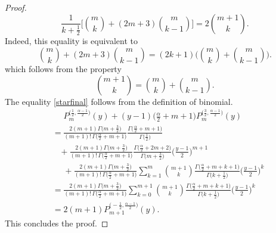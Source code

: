 \documentclass[10pt,a4paper]{amsart}
\begin{document}
\begin{proof}
\begin{equation}
\label{starfinal}
\frac{1}{k+\frac{1}{2}}\bigg[\binom{m}{k}+(2m+3) \binom{m}{k-1}\bigg] = 2\binom{m+1}{k}.
\end{equation}
Indeed, this equality is equivalent to
\[
\binom{m}{k}+(2m+3) \binom{m}{k-1} = (2k+1)\bigg( \binom{m}{k}+\binom{m}{k-1}\bigg).
\]
which follows from the property
$$\binom{m+1}{k}=\binom{m}{k}+\binom{m}{k-1}.
$$
The equality \eqref{starfinal} follows from the definition of binomial.
\begin{align*}
	&\phantom{=}P_m^{\big(\frac{1}{2},\frac{\alpha-1}{2}\big)}(y)+(y-1)\Big(\frac{\alpha}{2}+m+1\Big)P_m^{\big(\frac{3}{2}, \frac{\alpha-1}{2}\big)}(y)\\
	&=\frac{2(m+1)\Gamma \big(m+\frac{3}{2}\big)}{(m+1)!\, \Gamma \big(\frac{\alpha}{2}+m+1\big)} \frac{\Gamma \big(\frac{\alpha}{2}+m+1\big)}{\Gamma\big(\frac{1}{2}\big)}\\
	& \, \, \, \, \,  +\frac{2(m+1)\Gamma \big(m+\frac{3}{2}\big)}{(m+1)!\, \Gamma \big(\frac{\alpha}{2}+m+1\big)} \frac{\Gamma \big(\frac{\alpha}{2}+2m+2\big)}{\Gamma\big(m+\frac{3}{2}\big)}\bigg(\frac{y-1}{2}\bigg)^{m+1}\\
	&\phantom{=}+
	\frac{2(m+1)\Gamma \big(m+\frac{3}{2}\big)}{(m+1)!\, \Gamma \big(\frac{\alpha}{2}+m+1\big)}  \sum_{k=1}^{m} \binom{m+1}{k} \frac{\Gamma\big(\frac{\alpha}{2}+m+k+1\big)}{\Gamma \big(k+\frac{1}{2}\big)} \bigg(\frac{y-1}{2}\bigg)^k \\
	&=\frac{2(m+1)\Gamma \big(m+\frac{3}{2}\big)}{(m+1)!\, \Gamma \big(\frac{\alpha}{2}+m+1\big)}  \sum_{k=0}^{m+1} \binom{m+1}{k} \frac{\Gamma\big(\frac{\alpha}{2}+m+k+1\big)}{\Gamma \big(k+\frac{1}{2}\big)} \bigg(\frac{y-1}{2}\bigg)^k\\
	& =2(m+1)P_{m+1}^{\big(-\frac{1}{2}, \frac{\alpha-1}{2}\big)}(y).
\end{align*}
This concludes the proof.
\end{proof}
\end{document}
